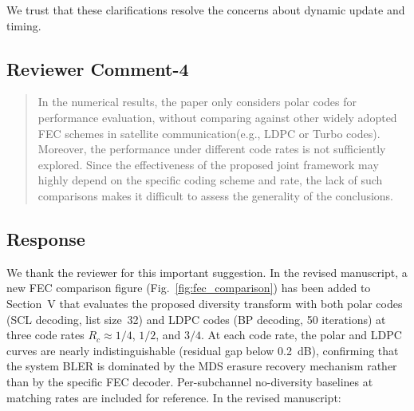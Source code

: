 We trust that these clarifications resolve the concerns about dynamic update and timing.


\subsection{Reviewer Comment-4}



\begin{mdframed}
\begin{quote}
In the numerical results, the paper only considers polar codes for performance evaluation, without comparing against other widely adopted FEC schemes in satellite communication(e.g., LDPC or Turbo codes). Moreover, the performance under different code rates is not sufficiently explored. Since the effectiveness of the proposed joint framework may highly depend on the specific coding scheme and rate, the lack of such comparisons makes it difficult to assess the generality of the conclusions.
\end{quote}

\end{mdframed}


\subsection{Response}

We thank the reviewer for this important suggestion. In the revised manuscript, a new FEC comparison figure (Fig.~\ref{fig:fec_comparison}) has been added to Section~V that evaluates the proposed diversity transform with both polar codes (SCL decoding, list size~32) and LDPC codes (BP decoding, 50 iterations) at three code rates $R_c \approx 1/4$, $1/2$, and $3/4$. At each code rate, the polar and LDPC curves are nearly indistinguishable (residual gap below 0.2~dB), confirming that the system BLER is dominated by the MDS erasure recovery mechanism rather than by the specific FEC decoder. Per-subchannel no-diversity baselines at matching rates are included for reference. In the revised manuscript:

